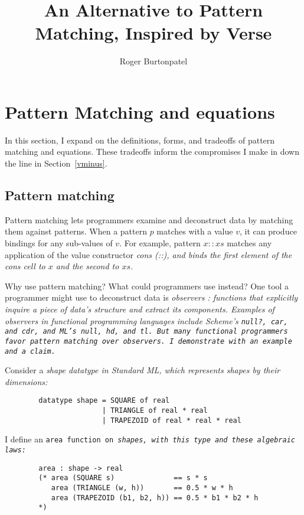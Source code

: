 \documentclass[manuscript,screen,review, 12pt, nonacm]{acmart}
\title{An Alternative to Pattern Matching, Inspired by Verse}
\author{Roger Burtonpatel}
\affiliation{%
  \institution{Tufts University}
  \streetaddress{419 Boston Ave}
  \city{Medford}
  \state{Massachusetts}
  \country{USA}
  \postcode{02155}
}
\begin{document}
\section{Pattern Matching and equations}
\label{pmandequations}

In this section, I expand on the definitions, forms, and tradeoffs of pattern
matching and equations. These tradeoffs inform the compromises I make in
\VMinus down the line in Section~\ref{vminus}.

\subsection{Pattern matching}
\label{pmoverobservers}


Pattern matching lets programmers examine and deconstruct data by matching them
against patterns. When a pattern $p$ matches with a value $v$, it can produce
bindings for any sub-values of $v$. For example, pattern $x::xs$ matches any 
application of the value constructor \it{cons} (\it{::}), and binds the first 
element of the cons cell to $x$ and the second to $xs$. 

Why use pattern matching? What could programmers use instead? One tool a
programmer might use to deconstruct data is \it{observers}
\citep{liskov:abstraction}: functions that explicitly inquire a piece of data's
structure and extract its components. Examples of observers in functional
programming languages include Scheme's \tt{null?}, \tt{car}, and \tt{cdr}, and
ML's \tt{null}, \tt{hd}, and \tt{tl}. But many functional programmers favor
pattern matching over observers. I demonstrate with an example and a claim. 

Consider a \it{shape} datatype in Standard ML, which represents shapes by their
dimensions: 

\medskip 
\begin{minipage}[t]{\textwidth}
    \begin{verbatim}
        datatype shape = SQUARE of real 
                       | TRIANGLE of real * real 
                       | TRAPEZOID of real * real * real
\end{verbatim}
\end{minipage}
\medskip 

I define an \tt{area} function on \it{shape}s, with this type and these
algebraic laws: 

\medskip 
\begin{minipage}[t]{\textwidth}
    \begin{verbatim}
        area : shape -> real 
        (* area (SQUARE s)              == s * s 
           area (TRIANGLE (w, h))       == 0.5 * w * h
           area (TRAPEZOID (b1, b2, h)) == 0.5 * b1 * b2 * h
        *)
\end{verbatim}
\end{minipage}
\medskip 
\end{document}
